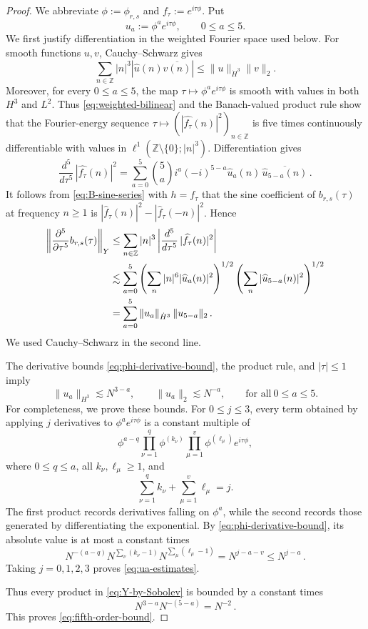\documentclass[11pt]{amsart}
\theoremstyle{definition}
\theoremstyle{remark}
\newcommand{\Z}{\mathbb Z}
\newcommand{\wh}{\widehat}
\begin{document}
\begin{proof}
We abbreviate $\phi:=\phi_{r,s}$ and $f_\tau:=e^{i\tau\phi}$.  Put
\[
 u_a:=\phi^a e^{i\tau\phi},
 \qquad 0\leq a\leq5.
\]
We first justify differentiation in the weighted Fourier space used below. For
smooth functions $u,v$, Cauchy--Schwarz gives
\begin{equation}\label{eq:weighted-bilinear}
 \sum_{n\in\Z}|n|^3
 |\wh u(n)\overline{\wh v(n)}|
 \leq \|u\|_{\dot H^3}\|v\|_2.
\end{equation}
Moreover, for every $0\leq a\leq5$, the map
$\tau\mapsto \phi^a e^{i\tau\phi}$ is smooth with values in both $H^3$ and
$L^2$. Thus \eqref{eq:weighted-bilinear} and the Banach-valued product rule
show that the Fourier-energy sequence
$\tau\mapsto (|\wh{f_\tau}(n)|^2)_{n\in\Z}$ is five times continuously
differentiable with values in
$\ell^1(\Z\setminus\{0\};|n|^3)$. Differentiation gives
\begin{equation}\label{eq:fifth-energy-derivative}
    \frac{d^5}{d\tau^5} \, |\wh{f_\tau}(n)|^2
 =\sum_{a=0}^5\binom5a i^a(-i)^{5-a}
 \wh u_a(n)\,\overline{\wh u_{5-a}(n)} \,.
\end{equation}
It follows from \eqref{eq:B-sine-series} with $h=f_\tau$ that the sine coefficient of $b_{r,s}(\tau)$ at frequency $n\geq1$ is $|\wh f_\tau(n)|^2 - |\wh f_\tau(-n)|^2$.  Hence
\begin{align}
 \left\|\frac{\partial^5}{\partial\tau^5}
 b_{r,s}(\tau)\right\|_Y
 &\leq\sum_{n\in\Z}|n|^3 \left|\frac{d^5}{d\tau^5} \, |\wh{f_\tau}(n)|^2 \right| \notag\\
 &\lesssim \sum_{a=0}^5
 \left(\sum_n|n|^6|\wh u_a(n)|^2\right)^{1/2}
 \left(\sum_n|\wh u_{5-a}(n)|^2\right)^{1/2}\notag\\
 &=\sum_{a=0}^5
 \|u_a\|_{\dot H^3}\,\|u_{5-a}\|_2 \,.
 \label{eq:Y-by-Sobolev}
\end{align}
We used Cauchy--Schwarz in the second line.

The derivative bounds \eqref{eq:phi-derivative-bound}, the product rule, and $|\tau|\leq1$ imply
\begin{equation}\label{eq:ua-estimates}
 \|u_a\|_{H^3}\lesssim N^{3-a},
 \qquad
 \|u_a\|_2\lesssim N^{-a},
 \qquad \text{for all}\ 0\leq a\leq5.
\end{equation}
For completeness, we prove these bounds.  For $0\leq j\leq3$, every term obtained by applying $j$ derivatives to $\phi^a e^{i\tau\phi}$ is a constant multiple of
\[
 \phi^{a-q}
 \prod_{\nu=1}^{q}\phi^{(k_\nu)}
 \prod_{\mu=1}^{v}\phi^{(\ell_\mu)}
 e^{i\tau\phi},
\]
where $0\leq q\leq a$, all $k_\nu,\ell_\mu\geq1$, and
\[
 \sum_{\nu=1}^{q}k_\nu+
 \sum_{\mu=1}^{v}\ell_\mu=j.
\]
The first product records derivatives falling on $\phi^a$, while the second records those generated by differentiating the exponential.  By \eqref{eq:phi-derivative-bound}, its absolute value is at most a constant times
\[
 N^{-(a-q)}
 N^{\sum_\nu(k_\nu-1)}
 N^{\sum_\mu(\ell_\mu-1)}
 = N^{j-a-v} \leq N^{j-a} \,.
\]
Taking $j=0,1,2,3$ proves \eqref{eq:ua-estimates}.  

Thus every product in \eqref{eq:Y-by-Sobolev} is bounded by a constant times 
\[
 N^{3-a}N^{-(5-a)}= N^{-2} \,.
\]
This proves \eqref{eq:fifth-order-bound}.
\end{proof}
\end{document}
